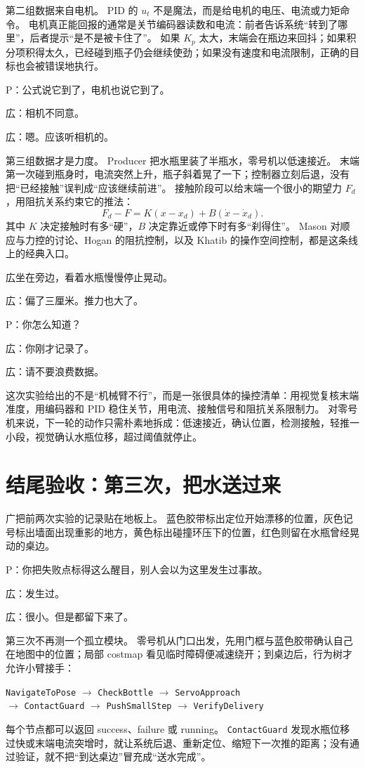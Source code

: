 第二组数据来自电机。
PID 的 $u_t$ 不是魔法，而是给电机的电压、电流或力矩命令。
电机真正能回报的通常是关节编码器读数和电流：前者告诉系统“转到了哪里”，后者提示“是不是被卡住了”。
如果 $K_p$ 太大，末端会在瓶边来回抖；如果积分项积得太久，已经碰到瓶子仍会继续使劲；如果没有速度和电流限制，正确的目标也会被错误地执行。

P：公式说它到了，电机也说它到了。

広：相机不同意。

広：嗯。应该听相机的。

第三组数据才是力度。
Producer 把水瓶里装了半瓶水，零号机以低速接近。
末端第一次碰到瓶身时，电流突然上升，瓶子斜着晃了一下；控制器立刻后退，没有把“已经接触”误判成“应该继续前进”。
接触阶段可以给末端一个很小的期望力 $F_d$，用阻抗关系约束它的推法：
\begin{equation}
F_d-F=K(x-x_d)+B(\dot{x}-\dot{x}_d).
\end{equation}
其中 $K$ 决定接触时有多“硬”，$B$ 决定靠近或停下时有多“刹得住”。
Mason 对顺应与力控的讨论、Hogan 的阻抗控制，以及 Khatib 的操作空间控制，都是这条线上的经典入口\cite{mason1981compliance,hogan1985impedance,khatib1987operational}。

広坐在旁边，看着水瓶慢慢停止晃动。

広：偏了三厘米。推力也大了。

P：你怎么知道？

広：你刚才记录了。

広：请不要浪费数据。

这次实验给出的不是“机械臂不行”，而是一张很具体的操控清单：用视觉复核末端准度，用编码器和 PID 稳住关节，用电流、接触信号和阻抗关系限制力。
对零号机来说，下一轮的动作只需朴素地拆成：低速接近，确认位置，检测接触，轻推一小段，视觉确认水瓶位移，超过阈值就停止。

\section{结尾验收：第三次，把水送过来}

广把前两次实验的记录贴在地板上。
蓝色胶带标出定位开始漂移的位置，灰色记号标出墙面出现重影的地方，黄色标出碰撞环压下的位置，红色则留在水瓶曾经晃动的桌边。

P：你把失败点标得这么醒目，别人会以为这里发生过事故。

広：发生过。

広：很小。但是都留下来了。

第三次不再测一个孤立模块。
零号机从门口出发，先用门框与蓝色胶带确认自己在地图中的位置；局部 costmap 看见临时障碍便减速绕开；到桌边后，行为树才允许小臂接手：
\begin{center}
{\small
\texttt{NavigateToPose} $\rightarrow$ \texttt{CheckBottle} $\rightarrow$ \texttt{ServoApproach}\\
$\rightarrow$ \texttt{ContactGuard} $\rightarrow$ \texttt{PushSmallStep} $\rightarrow$ \texttt{VerifyDelivery}}
\end{center}
每个节点都可以返回 success、failure 或 running。
\texttt{ContactGuard} 发现水瓶位移过快或末端电流突增时，就让系统后退、重新定位、缩短下一次推的距离；没有通过验证，就不把“到达桌边”冒充成“送水完成”。

